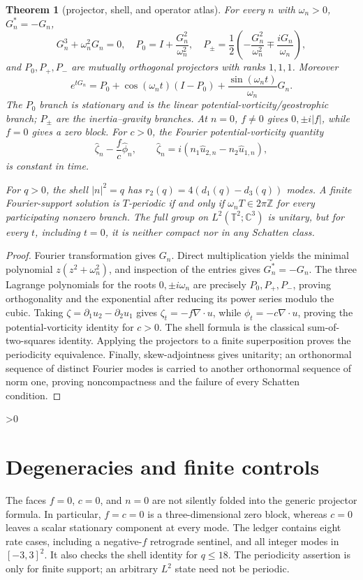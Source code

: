 \documentclass[11pt]{article}
\newtheorem{theorem}{Theorem}
\begin{document}
\begin{theorem}[projector, shell, and operator atlas]\label{thm:atlas}
For every \(n\) with \(\omega_n>0\), \(G_n^*=-G_n\),
\[
 G_n^3+\omega_n^2G_n=0,\quad
 P_0=I+\frac{G_n^2}{\omega_n^2},\quad
 P_\pm=\frac12\left(-\frac{G_n^2}{\omega_n^2}\mp\frac{iG_n}{\omega_n}\right),
\]
and \(P_0,P_+,P_-\) are mutually orthogonal projectors with ranks \(1,1,1\).
Moreover
\[
 e^{tG_n}=P_0+\cos(\omega_nt)(I-P_0)
       +\frac{\sin(\omega_nt)}{\omega_n}G_n .
\]
The \(P_0\) branch is stationary and is the linear
potential-vorticity/geostrophic branch; \(P_\pm\) are the inertia--gravity
branches.  At \(n=0\), \(f\ne0\) gives \(0,\pm i|f|\), while \(f=0\) gives a
zero block.  For \(c>0\), the Fourier potential-vorticity quantity
\[
 \widehat\zeta_n-\frac{f}{c}\widehat\phi_n,\qquad
 \widehat\zeta_n=i(n_1\widehat u_{2,n}-n_2\widehat u_{1,n}),
\]
is constant in time.

For \(q>0\), the shell \(|n|^2=q\) has
\(r_2(q)=4(d_1(q)-d_3(q))\) modes.  A finite Fourier-support solution is
\(T\)-periodic if and only if \(\omega_nT\in2\pi\mathbb Z\) for every
participating nonzero branch.  The full group on
\(L^2(\mathbb T^2;\mathbb C^3)\) is unitary, but for every \(t\), including
\(t=0\), it is neither compact nor in any Schatten class.
\end{theorem}

\begin{proof}
Fourier transformation gives \(G_n\).  Direct multiplication yields the
minimal polynomial \(z(z^2+\omega_n^2)\), and inspection of the entries gives
\(G_n^*=-G_n\).  The three Lagrange polynomials for the roots
\(0,\pm i\omega_n\) are precisely \(P_0,P_+,P_-\), proving orthogonality and
the exponential after reducing its power series modulo the cubic.  Taking
\(\zeta=\partial_1u_2-\partial_2u_1\) gives
\(\zeta_t=-f\nabla\cdot u\), while \(\phi_t=-c\nabla\cdot u\), proving the
potential-vorticity identity for \(c>0\).  The shell formula is the classical
sum-of-two-squares identity.  Applying the projectors to a finite
superposition proves the periodicity equivalence.  Finally, skew-adjointness
gives unitarity; an orthonormal sequence of distinct Fourier modes is carried
to another orthonormal sequence of norm one, proving noncompactness and the
failure of every Schatten condition.
\end{proof}

\ifnum\CRevisionRound>0
\section{Degeneracies and finite controls}
The faces \(f=0\), \(c=0\), and \(n=0\) are not silently folded into the
generic projector formula.  In particular, \(f=c=0\) is a three-dimensional
zero block, whereas \(c=0\) leaves a scalar stationary component at every
mode.  The ledger contains eight rate cases, including a negative-\(f\)
retrograde sentinel, and all integer modes in \([-3,3]^2\).  It also checks
the shell identity for \(q\leq18\).  The periodicity assertion is only for
finite support; an arbitrary \(L^2\) state need not be periodic.
\fi
\end{document}
